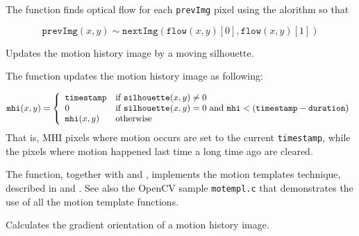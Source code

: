 The function finds optical flow for each \texttt{prevImg} pixel using the alorithm so that

\[\texttt{prevImg}(x,y) \sim \texttt{nextImg}(\texttt{flow}(x,y)[0], \texttt{flow}(x,y)[1])\]


Updates the motion history image by a moving silhouette.

\begin{description}
\end{description}

The function updates the motion history image as following:

\[
\texttt{mhi}(x,y)=\left\{ \begin{array}{l l} \texttt{timestamp} & \mbox{if $\texttt{silhouette}(x,y) \ne 0$}\\ 0 & \mbox{if $\texttt{silhouette}(x,y) = 0$ and $\texttt{mhi} < (\texttt{timestamp} - \texttt{duration})$}\\ \texttt{mhi}(x,y) & \mbox{otherwise}\\ \end{array} \right.
\]
That is, MHI pixels where motion occurs are set to the current \texttt{timestamp}, while the pixels where motion happened last time a long time ago are cleared.

The function, together with  and , implements the motion templates technique, described in \cite{Davis97} and \cite{Bradski00}.
See also the OpenCV sample \texttt{motempl.c} that demonstrates the use of all the motion template functions.

Calculates the gradient orientation of a motion history image.

